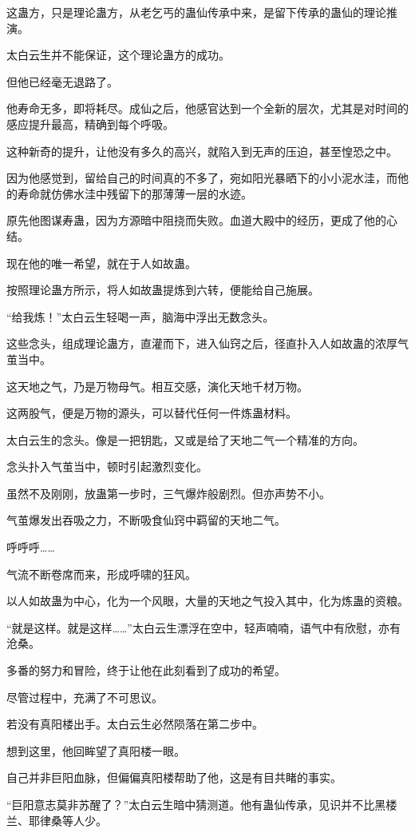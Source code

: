 \begin{this_body}
这蛊方，只是理论蛊方，从老乞丐的蛊仙传承中来，是留下传承的蛊仙的理论推演。

太白云生并不能保证，这个理论蛊方的成功。

但他已经毫无退路了。

他寿命无多，即将耗尽。成仙之后，他感官达到一个全新的层次，尤其是对时间的感应提升最高，精确到每个呼吸。

这种新奇的提升，让他没有多久的高兴，就陷入到无声的压迫，甚至惶恐之中。

因为他感觉到，留给自己的时间真的不多了，宛如阳光暴晒下的小小泥水洼，而他的寿命就仿佛水洼中残留下的那薄薄一层的水迹。

原先他图谋寿蛊，因为方源暗中阻挠而失败。血道大殿中的经历，更成了他的心结。

现在他的唯一希望，就在于人如故蛊。

按照理论蛊方所示，将人如故蛊提炼到六转，便能给自己施展。

“给我炼！”太白云生轻喝一声，脑海中浮出无数念头。

这些念头，组成理论蛊方，直灌而下，进入仙窍之后，径直扑入人如故蛊的浓厚气茧当中。

这天地之气，乃是万物母气。相互交感，演化天地千材万物。

这两股气，便是万物的源头，可以替代任何一件炼蛊材料。

太白云生的念头。像是一把钥匙，又或是给了天地二气一个精准的方向。

念头扑入气茧当中，顿时引起激烈变化。

虽然不及刚刚，放蛊第一步时，三气爆炸般剧烈。但亦声势不小。

气茧爆发出吞吸之力，不断吸食仙窍中羁留的天地二气。

呼呼呼……

气流不断卷席而来，形成呼啸的狂风。

以人如故蛊为中心，化为一个风眼，大量的天地之气投入其中，化为炼蛊的资粮。

“就是这样。就是这样……”太白云生漂浮在空中，轻声喃喃，语气中有欣慰，亦有沧桑。

多番的努力和冒险，终于让他在此刻看到了成功的希望。

尽管过程中，充满了不可思议。

若没有真阳楼出手。太白云生必然陨落在第二步中。

想到这里，他回眸望了真阳楼一眼。

自己并非巨阳血脉，但偏偏真阳楼帮助了他，这是有目共睹的事实。

“巨阳意志莫非苏醒了？”太白云生暗中猜测道。他有蛊仙传承，见识并不比黑楼兰、耶律桑等人少。


\end{this_body}
